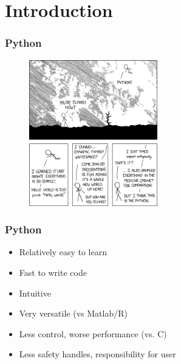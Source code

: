 \section{Introduction} %
\label{sec:introduction}

\begin{frame}\frametitle{Python}

    \begin{figure}
        \centering
        \centering
        \includegraphics[height=2.5in]{"img/python"}
        \label{fig:xkcd}
    \end{figure}

\end{frame}

\begin{frame}\frametitle{Python}

    \begin{itemize}
        \item Relatively easy to learn
        \item Fast to write code
        \item Intuitive
        \item Very versatile (vs Matlab/R)
        \item Less control, worse performance (vs. C)
        \item Less safety handles, responsibility for user
    \end{itemize}

\end{frame}

